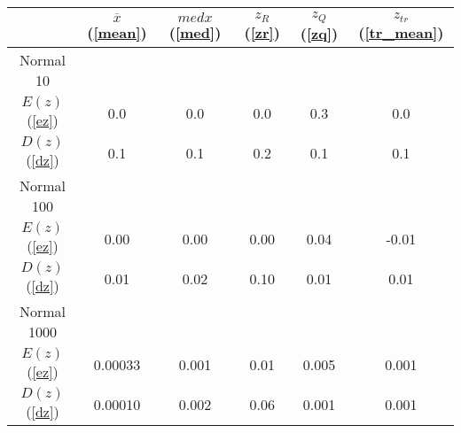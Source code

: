 \begin{tabular}{|c|c|c|c|c|c|}
\hline
 & $\overline{x}$ (\ref{mean}) & $med x$ (\ref{med}) & $z_R$ (\ref{zr}) & $z_Q$ (\ref{zq}) & $z_{tr}$ (\ref{tr_mean})\\
\hline
Normal 10 &  &  &  &  & \\
\hline
$E(z)$ (\ref{ez}) & 0.0 & 0.0 & 0.0 & 0.3 & 0.0\\
\hline
$D(z)$ (\ref{dz}) & 0.1 & 0.1 & 0.2 & 0.1 & 0.1\\
\hline
Normal 100 &  &  &  &  & \\
\hline
$E(z)$ (\ref{ez}) & 0.00 & 0.00 & 0.00 & 0.04 & -0.01\\
\hline
$D(z)$ (\ref{dz}) & 0.01 & 0.02 & 0.10 & 0.01 & 0.01\\
\hline
Normal 1000 &  &  &  &  & \\
\hline
$E(z)$ (\ref{ez}) & 0.00033 & 0.001 & 0.01 & 0.005 & 0.001\\
\hline
$D(z)$ (\ref{dz}) & 0.00010 & 0.002 & 0.06 & 0.001 & 0.001\\
\hline
\end{tabular}

